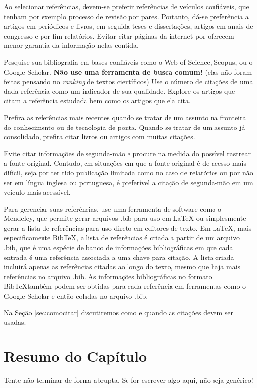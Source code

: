 Ao selecionar referências, devem-se preferir referências de veículos confiáveis, que tenham por exemplo processo de revisão por pares. Portanto, dá-se preferência a artigos em periódicos e livros, em seguida teses e dissertações, artigos em anais de congresso e por fim relatórios. Evitar citar páginas da internet por oferecem menor garantia da informação nelas contida. 

Pesquise sua bibliografia em bases confiáveis como o \textsf{Web of Science}, \textsf{Scopus}, ou o \textsf{Google Scholar}. \textbf{Não use uma ferramenta de busca comum!} (elas não foram feitas pensando no \emph{ranking} de textos científicos) Use o número de citações de uma dada referência como um indicador de sua qualidade. Explore os artigos que citam a referência estudada bem como os artigos que ela cita.

Prefira as referências mais recentes quando se tratar de um assunto na fronteira do conhecimento ou de tecnologia de ponta. Quando se tratar de um assunto já consolidado, prefira citar livros ou artigos com muitas citações. 

Evite citar informações de segunda-mão e procure na medida do possível rastrear a fonte original. Contudo, em situações em que a fonte original é de acesso mais difícil, seja por ter tido publicação limitada como no caso de relatórios ou por não ser em língua inglesa ou portuguesa, é preferível a citação de segunda-mão em um veículo mais acessível.

Para gerenciar suas referências, use uma ferramenta de software como o \textsf{Mendeley}, que permite gerar arquivos .bib para uso em {\LaTeX} ou simplesmente gerar a lista de referências para uso direto em editores de texto. Em \LaTeX, mais especificamente Bib\TeX, a lista de referências é criada a partir de um arquivo .bib, que é uma espécie de banco de informações bibliográficas em que cada entrada é uma referência associada a uma chave para citação. A lista criada incluirá apenas as referências citadas ao longo do texto, mesmo que haja mais referências no arquivo .bib. As informações bibliográficas no formato Bib\TeX também podem ser obtidas para cada referência em ferramentas como o \textsf{Google Scholar} e então coladas no arquivo .bib.

Na Seção \ref{sec:comocitar} discutiremos como e quando as citações devem ser usadas.

\section{Resumo do Capítulo}

Tente não terminar de forma abrupta. Se for escrever algo aqui, não seja genérico!


\clearpage
